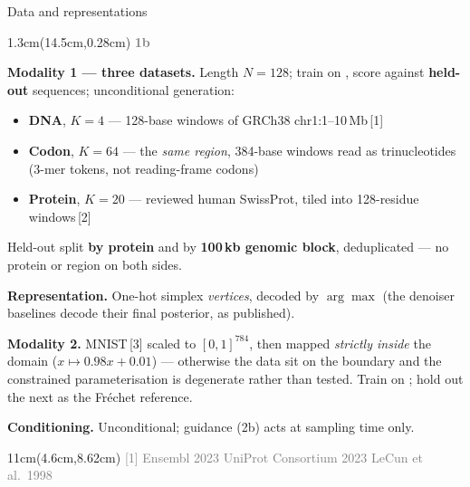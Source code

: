 \documentclass[aspectratio=169,10pt]{beamer}
\newcommand{\lab}[1]{%
  \begin{textblock*}{1.3cm}(14.5cm,0.28cm)
    \raggedleft\bfseries\small\textcolor{gray}{#1}
  \end{textblock*}}
\newcommand{\srcs}[1]{%
  \begin{textblock*}{11cm}(4.6cm,8.62cm)
    \raggedleft\fontsize{4.8}{5.6}\selectfont\textcolor{gray}{#1}
  \end{textblock*}}
\begin{document}
\begin{frame}{Data and representations}
\lab{1b}
\textbf{Modality 1 --- three datasets.} Length $N{=}128$; train on \MOneTrain{}, score against
\MOneHeldout{} \textbf{held-out} sequences; unconditional generation:
\begin{itemize}
\item \textbf{DNA}, $K{=}4$ --- 128-base windows of GRCh38 chr1:1--10\,Mb\,[1]
\item \textbf{Codon}, $K{=}64$ --- the \emph{same region}, 384-base windows read as trinucleotides
(3-mer tokens, not reading-frame codons)
\item \textbf{Protein}, $K{=}20$ --- reviewed human SwissProt, tiled into 128-residue windows\,[2]
\end{itemize}
Held-out split \textbf{by protein} and by \textbf{100\,kb genomic block}, deduplicated --- no
protein or region on both sides.

\medskip
\textbf{Representation.} One-hot simplex \emph{vertices}, decoded by $\arg\max$ (the denoiser
baselines decode their final posterior, as published).

\medskip
\textbf{Modality 2.} MNIST\,[3] scaled to $[0,1]^{784}$, then mapped \emph{strictly inside} the
domain ($x \mapsto 0.98x + 0.01$) --- otherwise the data sit on the boundary and the
constrained parameterisation is degenerate rather than tested. Train on \MTwoTrain{}; hold out the next \MTwoEval{} as the Fr\'echet reference.

\medskip
\textbf{Conditioning.} Unconditional; guidance (2b) acts at sampling time only.
\srcs{[1] Ensembl 2023 \quad [2] UniProt Consortium 2023 \quad [3] LeCun et al.\ 1998}
\end{frame}
\end{document}
